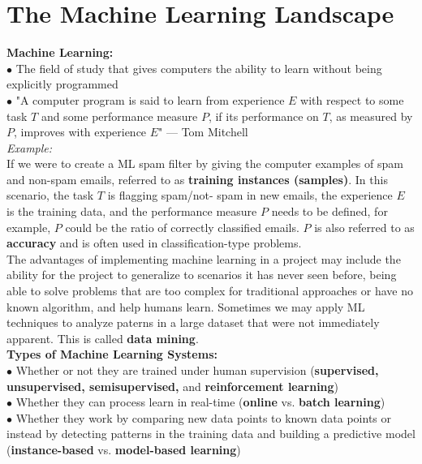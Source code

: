\section{The Machine Learning Landscape}

    \textbf{Machine Learning:} \\
    $\bullet$ The field of study that gives computers the ability to learn without being explicitly programmed \\
    $\bullet$ "A computer program is said to learn from experience $E$ with respect to some task $T$ and some
    performance measure $P$, if its performance on $T$, as measured by $P$, improves with experience $E$"
    --- Tom Mitchell \\

    \noindent \color{blue} \textit{Example:} \color{black} \\
    If we were to create a ML spam filter by giving the computer examples of spam and non-spam emails,
    referred to as \textbf{training instances (samples)}. In this scenario, the task $T$ is flagging spam/not-
    spam in new emails, the experience $E$ is the training data, and the performance measure $P$ needs to be
    defined, for example, $P$ could be the ratio of correctly classified emails. $P$ is also referred to as
    \textbf{accuracy} and is often used in classification-type problems. \\

    \noindent The advantages of implementing machine learning in a project may include the ability for the
    project to generalize to scenarios it has never seen before, being able to solve problems that are too
    complex for traditional approaches or have no known algorithm, and help humans learn. Sometimes we may
    apply ML techniques to analyze paterns in a large dataset that were not immediately apparent. This is
    called \textbf{data mining}. \\

    \noindent \textbf{Types of Machine Learning Systems:} \\
    $\bullet$ Whether or not they are trained under human supervision (\textbf{supervised, unsupervised,
    semisupervised,} and \textbf{reinforcement learning}) \\
    $\bullet$ Whether they can process learn in real-time (\textbf{online} vs. \textbf{batch learning}) \\
    $\bullet$ Whether they work by comparing new data points to known data points or instead by detecting
    patterns in the training data and building a predictive model (\textbf{instance-based} vs.
    \textbf{model-based learning}) \\

